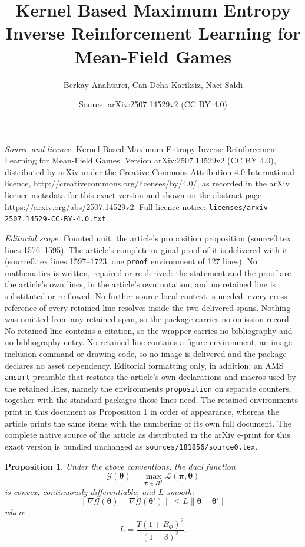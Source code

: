 \documentclass[10pt,a4paper]{amsart}
\title{Kernel Based Maximum Entropy Inverse Reinforcement Learning for Mean-Field Games}
\author{Berkay Anahtarci, Can Deha Kariksiz, Naci Saldi}
\date{Source: arXiv:2507.14529v2 (CC BY 4.0)}
\newtheorem{proposition}{Proposition}
\begin{document}
\maketitle

\noindent\emph{Source and licence.} Kernel Based Maximum Entropy Inverse Reinforcement Learning for Mean-Field Games. Version arXiv:2507.14529v2 (CC BY 4.0), distributed by arXiv under the Creative Commons Attribution 4.0 International licence, http://creativecommons.org/licenses/by/4.0/, as recorded in the arXiv licence metadata for this exact version and shown on the abstract page https://arxiv.org/abs/2507.14529v2. Full licence notice: \texttt{licenses/arxiv-2507.14529-CC-BY-4.0.txt}.\par\smallskip

\noindent\textit{Editorial scope.} Counted unit: the article's proposition proposition (source0.tex lines 1576--1595). The article's complete original proof of it is delivered with it (source0.tex lines 1597--1723, one \texttt{proof} environment of 127 lines). No mathematics is written, repaired or re-derived: the statement and the proof are the article's own lines, in the article's own notation, and no retained line is substituted or re-flowed.  No further source-local context is needed: every cross-reference of every retained line resolves inside the two delivered spans.  Nothing was omitted from any retained span, so the package carries no omission record.  No retained line contains a citation, so the wrapper carries no bibliography and no bibliography entry.  No retained line contains a figure environment, an image-inclusion command or drawing code, so no image is delivered and the package declares no asset dependency.  Editorial formatting only, in addition: an AMS \texttt{amsart} preamble that restates the article's own declarations and macros used by the retained lines, namely the environments \texttt{proposition} on separate counters, together with the standard packages those lines need.  The retained environments print in this document as Proposition 1 in order of appearance, whereas the article prints the same items with the numbering of its own full document.  The complete native source of the article as distributed in the arXiv e-print for this exact version is bundled unchanged as \texttt{sources/181856/source0.tex}.
\begin{proposition}
Under the above conventions, the dual function
\[
\mathcal G(\boldsymbol\theta)
=
\max_{\boldsymbol\pi\in\Pi^T}
\mathcal L(\boldsymbol\pi,\boldsymbol\theta)
\]
is convex, continuously differentiable, and $L$-smooth:
\[
\|\nabla\mathcal G(\boldsymbol\theta)
-
\nabla\mathcal G(\boldsymbol\theta')\|
\le
L
\|\boldsymbol\theta-\boldsymbol\theta'\|
\]
where 
\[ L = \frac{T(1+B_\Phi)^2}{(1-\beta)^2}. \]
\end{proposition}
\end{document}
